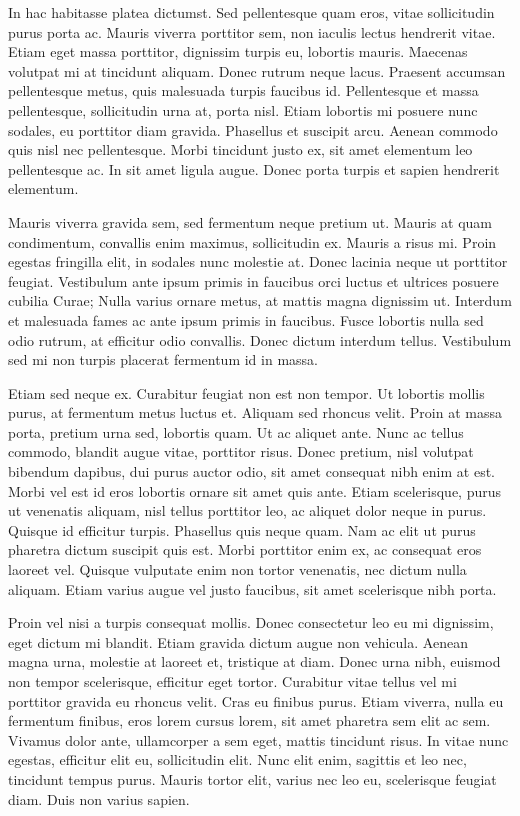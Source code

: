In hac habitasse platea dictumst. Sed pellentesque quam eros, vitae sollicitudin purus porta ac. Mauris viverra porttitor sem, non iaculis lectus hendrerit vitae. Etiam eget massa porttitor, dignissim turpis eu, lobortis mauris. Maecenas volutpat mi at tincidunt aliquam. Donec rutrum neque lacus. Praesent accumsan pellentesque metus, quis malesuada turpis faucibus id. Pellentesque et massa pellentesque, sollicitudin urna at, porta nisl. Etiam lobortis mi posuere nunc sodales, eu porttitor diam gravida. Phasellus et suscipit arcu. Aenean commodo quis nisl nec pellentesque. Morbi tincidunt justo ex, sit amet elementum leo pellentesque ac. In sit amet ligula augue. Donec porta turpis et sapien hendrerit elementum.

Mauris viverra gravida sem, sed fermentum neque pretium ut. Mauris at quam condimentum, convallis enim maximus, sollicitudin ex. Mauris a risus mi. Proin egestas fringilla elit, in sodales nunc molestie at. Donec lacinia neque ut porttitor feugiat. Vestibulum ante ipsum primis in faucibus orci luctus et ultrices posuere cubilia Curae; Nulla varius ornare metus, at mattis magna dignissim ut. Interdum et malesuada fames ac ante ipsum primis in faucibus. Fusce lobortis nulla sed odio rutrum, at efficitur odio convallis. Donec dictum interdum tellus. Vestibulum sed mi non turpis placerat fermentum id in massa.

Etiam sed neque ex. Curabitur feugiat non est non tempor. Ut lobortis mollis purus, at fermentum metus luctus et. Aliquam sed rhoncus velit. Proin at massa porta, pretium urna sed, lobortis quam. Ut ac aliquet ante. Nunc ac tellus commodo, blandit augue vitae, porttitor risus. Donec pretium, nisl volutpat bibendum dapibus, dui purus auctor odio, sit amet consequat nibh enim at est. Morbi vel est id eros lobortis ornare sit amet quis ante. Etiam scelerisque, purus ut venenatis aliquam, nisl tellus porttitor leo, ac aliquet dolor neque in purus. Quisque id efficitur turpis. Phasellus quis neque quam. Nam ac elit ut purus pharetra dictum suscipit quis est. Morbi porttitor enim ex, ac consequat eros laoreet vel. Quisque vulputate enim non tortor venenatis, nec dictum nulla aliquam. Etiam varius augue vel justo faucibus, sit amet scelerisque nibh porta.

Proin vel nisi a turpis consequat mollis. Donec consectetur leo eu mi dignissim, eget dictum mi blandit. Etiam gravida dictum augue non vehicula. Aenean magna urna, molestie at laoreet et, tristique at diam. Donec urna nibh, euismod non tempor scelerisque, efficitur eget tortor. Curabitur vitae tellus vel mi porttitor gravida eu rhoncus velit. Cras eu finibus purus. Etiam viverra, nulla eu fermentum finibus, eros lorem cursus lorem, sit amet pharetra sem elit ac sem. Vivamus dolor ante, ullamcorper a sem eget, mattis tincidunt risus. In vitae nunc egestas, efficitur elit eu, sollicitudin elit. Nunc elit enim, sagittis et leo nec, tincidunt tempus purus. Mauris tortor elit, varius nec leo eu, scelerisque feugiat diam. Duis non varius sapien.

